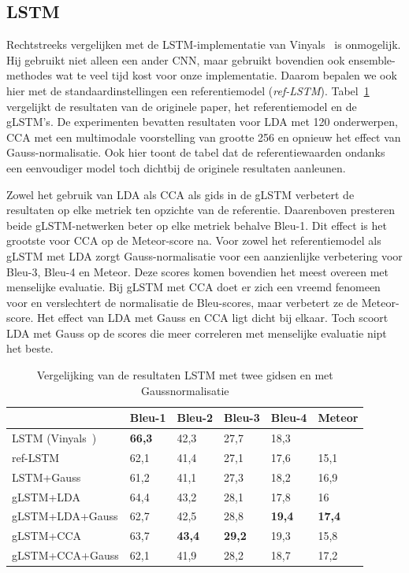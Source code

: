 \subsection{LSTM}
Rechtstreeks vergelijken met de LSTM-implementatie van Vinyals~\cite{Google} is onmogelijk. Hij gebruikt niet alleen een ander CNN, maar gebruikt bovendien ook ensemble-methodes wat te veel tijd kost voor onze implementatie. Daarom bepalen we ook hier met de standaardinstellingen een referentiemodel (\emph{ref-LSTM}). Tabel~\ref{table:lstm_results} vergelijkt de resultaten van de originele paper, het referentiemodel en de gLSTM's. De experimenten bevatten resultaten voor LDA met 120 onderwerpen, CCA met een multimodale voorstelling van grootte 256 en opnieuw het effect van Gauss-normalisatie. Ook hier toont de tabel dat de referentiewaarden ondanks een eenvoudiger model toch dichtbij de originele resultaten aanleunen.

Zowel het gebruik van LDA als CCA als gids in de gLSTM verbetert de resultaten op elke metriek ten opzichte van de referentie. Daarenboven presteren beide gLSTM-netwerken beter op elke metriek behalve Bleu-1. Dit effect is het grootste voor CCA op de Meteor-score na. Voor zowel het referentiemodel als gLSTM met LDA zorgt Gauss-normalisatie voor een aanzienlijke verbetering voor Bleu-3, Bleu-4 en Meteor. Deze scores komen bovendien het meest overeen met menselijke evaluatie. Bij gLSTM met CCA doet er zich een vreemd fenomeen voor en verslechtert de normalisatie de Bleu-scores, maar verbetert ze de Meteor-score. 
Het effect van LDA met Gauss en CCA ligt dicht bij elkaar. Toch scoort LDA met Gauss op de scores die meer correleren met menselijke evaluatie nipt het beste.
    \begin{table}
    	\centering
    	\begin{tabular}{llllll}
    		~                   & Bleu-1 & Bleu-2 & Bleu-3 & Bleu-4 & Meteor \\ \hline
    		LSTM (Vinyals~\cite{Google})      & \textbf{66,3}   & 42,3   & 27,7   & 18,3   & ~     \\ 
    		ref-LSTM         & 62,1   & 41,4   & 27,1   & 17,6   & 15,1  \\
    		LSTM+Gauss        & 61,2   & 41,1   & 27,3   & 18,2   & 16,9  \\
    		gLSTM+LDA         & 64,4   & 43,2   & 28,1   & 17,8   & 16  \\
    		gLSTM+LDA+Gauss & 62,7   & 42,5   & 28,8   & \textbf{19,4}   & \textbf{17,4}  \\
	        gLSTM+CCA         & 63,7   & \textbf{43,4}   & \textbf{29,2}   &19,3   & 15,8  \\
	        gLSTM+CCA+Gauss & 62,1   & 41,9   & 28,2   & 18,7   & 17,2  \\\hline
    	\end{tabular}
   	\caption{Vergelijking van de resultaten LSTM met twee gidsen en met Gaussnormalisatie}	
   	\label{table:lstm_results}
    \end{table}


